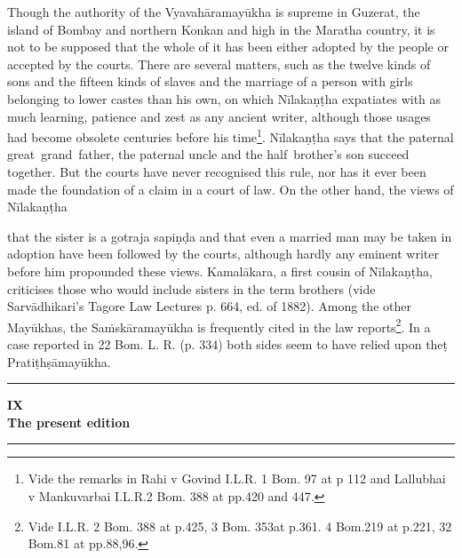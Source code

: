 \documentclass[11pt, openany]{book}
\begin{document}
Though the authority of the Vyavahāramayūkha is supreme in Guzerat, the island of Bombay and northern Konkan and high in the Maratha country, it is not to be supposed that the whole of it has been either adopted by the people or accepted by the courts. There are several matters, such as the twelve kinds of sons and the fifteen kinds of slaves and the marriage of a person with girls belonging to lower castes than his own, on which Nīlakaṇṭha expatiates with as much learning, patience and zest as any ancient writer, although those usages had become obsolete centuries before his time\renewcommand{\thefootnote}{3}\footnote{Vide the remarks in Rahi v Govind I.L.R. 1 Bom. 97 at p 112 and Lallubhai v Mankuvarbai I.L.R.2 Bom. 388 at pp.420 and 447.}. Nīlakaṇṭha says that the paternal great\textendash\ grand\textendash\ father, the paternal uncle and the half\textendash\ brother's son succeed together. But the courts have never recognised this rule, nor has it ever been made the foundation of a claim in a court of law. On the other hand, the views of Nīlakaṇṭha

\newpage

\noindent
that the sister is a gotraja sapiṇḍa and that even a married man may be taken in adoption have been followed by the courts, although hardly any eminent writer before him propounded these views. Kamalākara, a first cousin of Nīlakaṇṭha, criticises those who would include sisters in the term brothers (vide Sarvādhikari's Tagore Law Lectures p. 664, ed. of 1882). Among the other Mayūkhas, the Saṁskāramayūkha is frequently cited in the law reports\renewcommand{\thefootnote}{1}\footnote{Vide I.L.R. 2 Bom. 388 at p.425, 3 Bom. 353at p.361. 4 Bom.219 at p.221, 32 Bom.81 at pp.88,96.}. In a case reported in 22 Bom. L. R. (p. 334) both sides seem to have relied upon theṭ Pratiṭhṣāmayūkha.


\begin{center}
\rule{0.2\linewidth}{0.5pt}
\end{center}

\newpage

\begin{center}
\textbf{\large IX}\\

\textbf{\large The present edition}\\

\rule{0.2\linewidth}{0.5pt}
\end{center}
\end{document}
